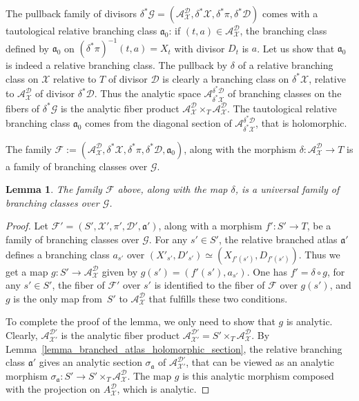 \documentclass[10pt]{amsart}
\theoremstyle{definition}
\theoremstyle{plain}
\newtheorem{lemma}[definition]{Lemma}
\begin{document}
The pullback family of divisors $\delta^*\mathcal G = \left(\mathcal A_{\mathcal X}^{\mathcal D}, \delta^*\mathcal X, \delta^* \pi, \delta^* \mathcal D\right)$ comes with a tautological relative branching class $\mathfrak a_0$: if $(t, a) \in \mathcal A_{\mathcal X}^{\mathcal D}$, the branching class defined by $\mathfrak a_0$ on $\left(\delta^*\pi\right)^{-1}(t, a) = X_t$ with divisor $D_t$ is $a$.
Let us show that $\mathfrak a_0$ is indeed a relative branching class.
The pullback by $\delta$ of a relative branching class on $\mathcal X$ relative to $T$ of divisor $\mathcal D$ is clearly a branching class on $\delta^* \mathcal X$, relative to $\mathcal A_{\mathcal X}^{\mathcal D}$ of divisor $\delta^* \mathcal D$.
Thus the analytic space $\mathcal A_{\delta^* \mathcal X}^{\delta^*\mathcal D}$ of branching classes on the fibers of $\delta^* \mathcal G$ is the analytic fiber product $\mathcal A_{\mathcal X}^{\mathcal D} \times_T \mathcal A_{\mathcal X}^{\mathcal D}$.
The tautological relative branching class $\mathfrak a_0$ comes from the diagonal section of $\mathcal A_{\delta^* \mathcal X}^{\delta^*\mathcal D}$, that is holomorphic.

The family $\mathcal F:= \left(\mathcal A_{\mathcal X}^{\mathcal D}, \delta^*\mathcal X, \delta^* \pi, \delta^* \mathcal D, \mathfrak a_0\right)$, along with the morphism $\delta: \mathcal A_{\mathcal X}^{\mathcal D} \to T$ is a family of branching classes over $\mathcal G$.

\begin{lemma}\label{lemma_univ_family_bc}
The family $\mathcal F$ above, along with the map $\delta$, is a universal family of branching classes over $\mathcal G$.
\end{lemma}

\begin{proof}
Let $\mathcal F' = (S', \mathcal X', \pi', \mathcal D', \mathfrak a')$, along with a morphism $f': S' \to T$, be a family of branching classes over $\mathcal G$. For any $s' \in S'$, the relative branched atlas $\mathfrak a'$ defines a branching class $a_{s'}$ over $\left(X'_{s'}, D'_{s'}\right) \simeq \left(X_{f'(s')}, D_{f'(s')}\right)$.
Thus we get a map $g: S' \to \mathcal A_{\mathcal X}^{\mathcal D}$ given by $g(s') = (f'(s'), a_{s'})$.
One has $f' = \delta \circ g$, for any $s' \in S'$, the fiber of $\mathcal F'$ over $s'$ is identified to the fiber of $\mathcal F$ over $g(s')$, and $g$ is the only map from~$S'$ to $\mathcal A_{\mathcal X}^{\mathcal D}$ that fulfills these two conditions.

To complete the proof of the lemma, we only need to show that $g$ is analytic.
Clearly, $\mathcal A_{\mathcal X'}^{\mathcal D'}$ is the analytic fiber product $\mathcal A_{\mathcal X'}^{\mathcal D'} = S' \times_T \mathcal A_{\mathcal X}^{\mathcal D}$.
By Lemma~\ref{lemma_branched_atlas_holomorphic_section}, the relative branching class $\mathfrak a'$ gives an analytic section $\sigma_{\mathfrak a}$ of $\mathcal A_{\mathcal X'}^{\mathcal D'}$, that can be viewed as an analytic morphism $\sigma_{\mathfrak a}: S' \to S' \times_T \mathcal A_{\mathcal X}^{\mathcal D}$.
The map $g$ is this analytic morphism composed with the projection on $A_{\mathcal X}^{\mathcal D}$, which is analytic.
\end{proof}
\end{document}
